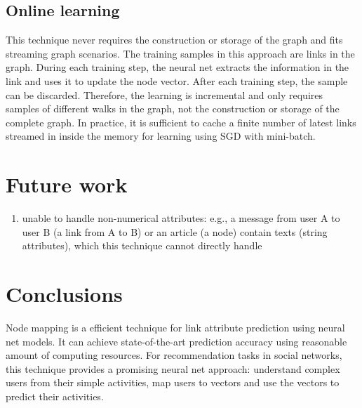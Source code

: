 \documentclass{article}
\begin{document}
\subsection{Online learning}
This technique never requires the construction or storage of the graph and fits 
streaming graph scenarios.
The training samples in this approach are links in the graph.
During each training step, the neural net extracts the information in the link 
and uses it to update the node vector.
After each training step, the sample can be discarded.
Therefore, the learning is incremental and only requires samples of different 
walks in the graph, not the construction or storage of the complete graph.
In practice, it is sufficient to cache a finite number of latest links streamed 
in inside the memory for learning using SGD with mini-batch.

\section{Future work}
\begin{enumerate}
	\item unable to handle non-numerical attributes: e.g., a message from user 
	A to user B (a link from A to B) or an article (a node) contain texts 
	(string attributes), which this technique cannot directly handle
\end{enumerate}

\section{Conclusions}
Node mapping is a efficient technique for link attribute prediction using 
neural net models.
It can achieve state-of-the-art prediction accuracy using reasonable amount of 
computing resources.
For recommendation tasks in social networks, this technique provides a 
promising neural net approach:
understand complex users from their simple activities, map users to 
vectors and use the vectors to predict their activities.



\end{document}

